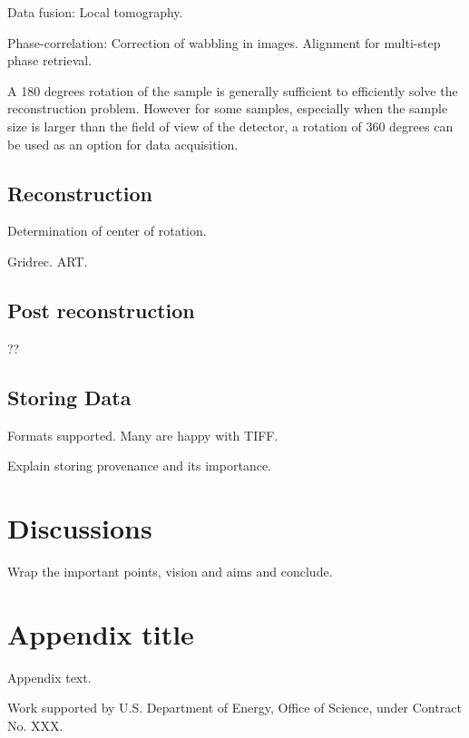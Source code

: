 \documentclass[pdf]{iucr}              %
\begin{document}
Data fusion: Local tomography. 

Phase-correlation: Correction of wabbling in images. Alignment for multi-step phase retrieval.

A 180 degrees rotation of the sample is generally sufficient to efficiently solve the reconstruction problem. However for some samples, especially when the sample size is larger than the field of view of the detector, a  rotation of 360 degrees can be used as an option for data acquisition. 

\subsection{Reconstruction}

Determination of center of rotation.

Gridrec. ART. 

\subsection{Post reconstruction}

??

\subsection{Storing Data}

Formats supported. Many are happy with TIFF. 

Explain storing provenance and its importance.

\section{Discussions}

Wrap the important points, vision and aims and conclude.

\appendix
\section{Appendix title}

Appendix text.



Work supported by U.S. Department of Energy, Office of Science, under Contract No. XXX.




 
\end{document}
